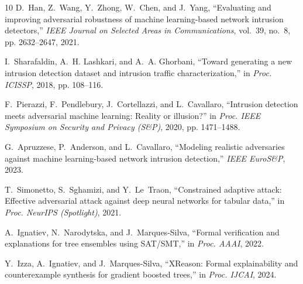 \documentclass[10pt,journal,compsoc]{IEEEtran}
\begin{document}
\begin{thebibliography}{10}
D.~Han, Z.~Wang, Y.~Zhong, W.~Chen, and J.~Yang, ``Evaluating and improving adversarial robustness of machine learning-based network intrusion detectors,'' \emph{IEEE Journal on Selected Areas in Communications}, vol.~39, no.~8, pp. 2632--2647, 2021.

I.~Sharafaldin, A.~H. Lashkari, and A.~A. Ghorbani, ``Toward generating a new intrusion detection dataset and intrusion traffic characterization,'' in \emph{Proc. ICISSP}, 2018, pp. 108--116.

F.~Pierazzi, F.~Pendlebury, J.~Cortellazzi, and L.~Cavallaro, ``Intrusion detection meets adversarial machine learning: Reality or illusion?'' in \emph{Proc. IEEE Symposium on Security and Privacy (S\&P)}, 2020, pp. 1471--1488.

G.~Apruzzese, P.~Anderson, and L.~Cavallaro, ``Modeling realistic adversaries against machine learning-based network intrusion detection,'' \emph{IEEE EuroS\&P}, 2023.

T.~Simonetto, S.~Sghamizi, and Y.~Le~Traon, ``Constrained adaptive attack: Effective adversarial attack against deep neural networks for tabular data,'' in \emph{Proc. NeurIPS (Spotlight)}, 2021.

A.~Ignatiev, N.~Narodytska, and J.~Marques-Silva, ``Formal verification and explanations for tree ensembles using SAT/SMT,'' in \emph{Proc. AAAI}, 2022.

Y.~Izza, A.~Ignatiev, and J.~Marques-Silva, ``XReason: Formal explainability and counterexample synthesis for gradient boosted trees,'' in \emph{Proc. IJCAI}, 2024.

\end{thebibliography}
\end{document}
